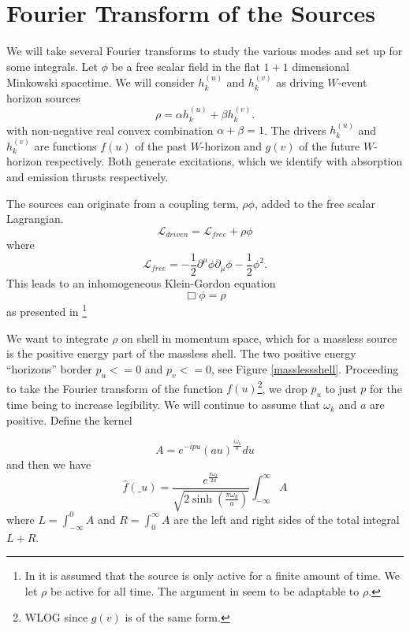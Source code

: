 \documentclass[12pt,a4paper]{article}
\begin{document}
\section{Fourier Transform of the Sources}
We will take several Fourier transforms to study the various modes and set up for some
integrals.  Let $\phi$ be a free scalar field in the flat $1+1$ dimensional Minkowski spacetime.  We will consider $h^{(u)}_k$ and $h^{(v )}_k$ as driving $W$-event horizon sources
\begin{equation}
\label{ab}
\rho = \alpha h^{(u)}_k + \beta h^{(v)}_k.
\end{equation}
with non-negative real convex combination $\alpha + \beta = 1$.
The drivers $h^{(u)}_k$ and $h^{(v)}_k$ are functions $f(u)$ of the past $W$-horizon and $g(v)$ of the future $W$-horizon respectively.  Both generate excitations, which we identify with absorption and emission thrusts respectively.


The sources can originate from a coupling term, $\rho \phi$, added to the free scalar Lagrangian.
\begin{equation}
\mathscr{L}_{driven} = \mathscr{L}_{free} + \rho\phi 
\end{equation}
where
\begin{equation}
  \mathscr{L}_{free} = -\frac{1}{2} \partial^\mu \phi \partial_\mu \phi - \frac{1}{2} \phi^2.
\end{equation}
This leads to an inhomogeneous Klein-Gordon equation
\begin{equation}
\Box  \phi = \rho
\end{equation}
as presented in \cite{beisert}\footnote{In \cite{beisert} it is assumed that the source is only active for a finite amount of time.  We let $\rho$ be active for all time.  The argument in \cite{beisert} seem to be adaptable to $\rho$.}

We want to integrate $\rho$ on shell in momentum space, which for a massless source is the positive energy part of the massless shell.  The two positive energy ``horizons'' border $p_u <= 0$ and $p_v <= 0$, see Figure \ref{masslessshell}.  Proceeding to take the Fourier transform of the function $f(u)$\footnote{WLOG since $g(v)$ is of the same form.}, we drop $p_u$ to just $p$ for the time being to increase legibility.  We will continue to assume that $\omega_k$ and $a$ are positive. Define the kernel

\begin{equation}
  A = e^{-i p u} (au)^\frac{i\omega_k}{a} du
\end{equation}
and then we have
\begin{equation}
\label{finalnorm}
  \hat{f}(\_u) =  \frac{e^{\frac{\pi \omega_k}{2a}}}{\sqrt{2 \sinh \left({\frac{\pi\omega_k}{a}}\right)}}  \int_{-\infty}^\infty A
\end{equation}
where $L=\int_{-\infty}^0 A$ and $R=\int_0^\infty A$ are the left and right sides of the total integral $L + R$.
\end{document}

